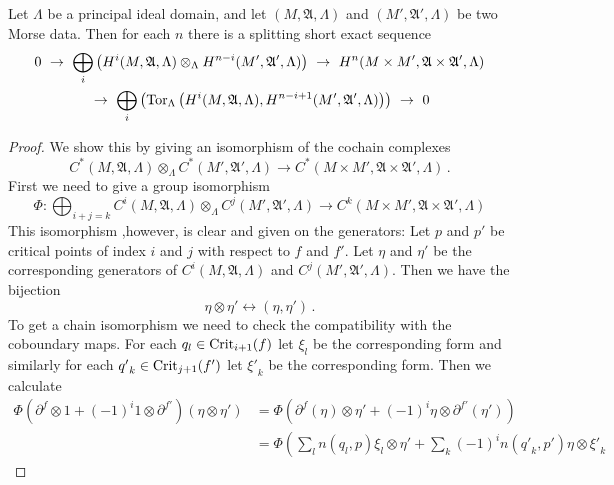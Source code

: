 \begin{theorem}
	Let $\Lambda$ be a principal ideal domain, and let $(M,\mathfrak{A},\Lambda)$ and $(M',\mathfrak{A}',\Lambda)$ be two Morse data. Then for each $n$ there is a splitting short exact sequence 
	\begin{multline*}
		0~\to ~
		\bigoplus_i\left(H^i(M,\mathfrak{A},\Lambda)\otimes_\Lambda H^{n-i}(M',\mathfrak{A}',\Lambda)\right) ~\to~
		H^n(M\times M',\mathfrak{A}\times \mathfrak{A}',\Lambda) \\
		~	\to ~
		\bigoplus_i\left(\operatorname{\mathrm{Tor}}_{\Lambda}\left(
		H^i(M,\mathfrak{A},\Lambda),H^{n-i+1}(M',\mathfrak{A}',\Lambda)
		\right) \right)~ \to ~0
	\end{multline*}
\end{theorem}
\begin{proof}
	We show this by giving an isomorphism of the cochain complexes 
	\begin{equation*}
		C^*(M,\mathfrak{A},\Lambda)\otimes_\Lambda C^*(M',\mathfrak{A}',\Lambda) \to C^*(M\times M',\mathfrak{A}\times \mathfrak{A}',\Lambda) \,.
	\end{equation*}
	First we need to give a group isomorphism 
	\begin{equation*}
		\Phi: \bigoplus_{i+j=k}C^i(M,\mathfrak{A},\Lambda)\otimes_\Lambda C^j(M',\mathfrak{A}',\Lambda) \to C^k(M\times M',\mathfrak{A}\times \mathfrak{A}',\Lambda)
	\end{equation*} This isomorphism ,however, is clear and given on the generators: Let $p$ and $p'$ be critical points of index $i$ and $j$ with respect to $f$ and $f'$. Let $\eta$ and $\eta'$ be the corresponding generators of $C^i(M,\mathfrak{A},\Lambda)$ and $C^j(M',\mathfrak{A}',\Lambda)$. Then we have the bijection 
	\begin{equation*}
		\eta \otimes \eta' \leftrightarrow (\eta,\eta')\,.
	\end{equation*} To get a chain isomorphism we need to check the compatibility with the coboundary maps. For each $q_l\in \mathrm{Crit}_{i+1}(f)$ let $\xi_l$ be the corresponding form and similarly for each ${q'}_k\in \mathrm{Crit}_{j+1}(f')$ let ${\xi'}_k$ be the corresponding form. Then we calculate
	\begin{align*}
	\Phi\left(
	 \partial^f\otimes 1+(-1)^i 1\otimes \partial^{f'}
	\right) (\eta \otimes \eta')
	&= \Phi\left(
	 \partial^f(\eta)\otimes \eta'+(-1)^i \eta\otimes \partial^{f'}(\eta')
	\right)\\
		&= \Phi\left(
	\sum_{l} n(q_l,p)\xi_l \otimes \eta'+\sum_k (-1)^i n({q'}_k,p')\eta\otimes {\xi'}_k

\end{align*}
\end{proof}
